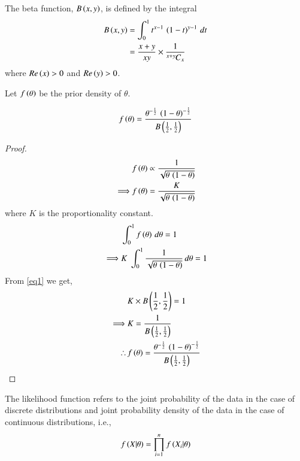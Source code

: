 \documentclass[journal,12pt,twocolumn]{IEEEtran}
\begin{document}
\begin{definition}
The beta function, $B\left(x,y\right)$, is defined by the integral
\begin{align}
    B\left(x,y\right) &= \int_0^1 t^{x-1}\,\left(1-t\right)^{y-1}\,dt\nonumber\\
    &= \frac{x+y}{xy}\times \frac{1}{{{}^{x+y}\mkern-1muC_{x}}}\label{eq1}
\end{align}
where $Re\left(x\right)>0$ and $Re\left(y\right)>0$.
\end{definition}

Let $f\left(\theta\right)$ be the prior density of $\theta$.
\begin{lemma}
\begin{align}
    f\left(\theta\right) = \frac{\theta^{-\frac{1}{2}}\,\left(1-\theta\right)^{-\frac{1}{2}}}{B\left(\frac{1}{2},\frac{1}{2}\right)}\label{eq6}
\end{align}
\end{lemma}

\begin{proof}
\begin{align}
    &f\left(\theta\right) \propto \frac{1}{\sqrt{\theta\,\left(1-\theta\right)}}\nonumber\\
    \implies &f\left(\theta\right) = \frac{K}{\sqrt{\theta\,\left(1-\theta\right)}}
\end{align}
where $K$ is the proportionality constant.
\begin{align}
    &\int_0^1 f\left(\theta\right)\,d\theta = 1\nonumber\\
    \implies &K\;\int_0^1 \frac{1}{\sqrt{\theta\,\left(1-\theta\right)}}\,d\theta =1
\end{align}
From \eqref{eq1} we get,
\begin{align}
    &K\times B\left(\frac{1}{2},\frac{1}{2}\right) = 1\nonumber\\
    \implies &K = \frac{1}{B\left(\frac{1}{2},\frac{1}{2}\right)}\\
    \therefore\, &f\left(\theta\right) = \frac{\theta^{-\frac{1}{2}}\,\left(1-\theta\right)^{-\frac{1}{2}}}{B\left(\frac{1}{2},\frac{1}{2}\right)}
\end{align}
\end{proof}

\begin{definition}
The likelihood function refers to the joint probability of the data in the case of discrete distributions and joint probability density of the data in the case of continuous distributions, i.e., 
\begin{align}
    f\left(X|\theta\right) = \prod_{i=1}^n f\left(X_i|\theta\right)\label{eq8}
\end{align}
\end{definition}
\end{document}
